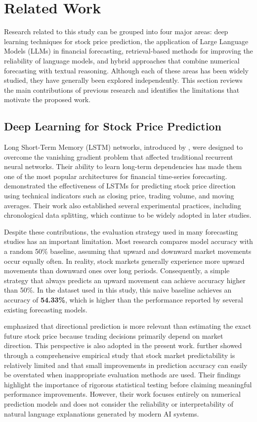 \section{Related Work}\label{sec:related-work}

Research related to this study can be grouped into four major areas:
deep learning techniques for stock price prediction, the application of
Large Language Models (LLMs) in financial forecasting, retrieval-based
methods for improving the reliability of language models, and hybrid
approaches that combine numerical forecasting with textual reasoning.
Although each of these areas has been widely studied, they have
generally been explored independently. This section reviews the main
contributions of previous research and identifies the limitations that
motivate the proposed work.

\subsection{Deep Learning for Stock Price Prediction}\label{sec:deep-learning}

Long Short-Term Memory (LSTM) networks, introduced by \citet{hochreiter1997}, were designed to overcome the vanishing gradient
problem that affected traditional recurrent neural networks. Their
ability to learn long-term dependencies has made them one of the most
popular architectures for financial time-series forecasting. \citet{nelson2017} demonstrated the effectiveness of LSTMs for predicting stock
price direction using technical indicators such as closing price,
trading volume, and moving averages. Their work also established several
experimental practices, including chronological data splitting, which
continue to be widely adopted in later studies.

Despite these contributions, the evaluation strategy used in many
forecasting studies has an important limitation. Most research compares
model accuracy with a random 50\% baseline, assuming that upward and
downward market movements occur equally often. In reality, stock markets
generally experience more upward movements than downward ones over long
periods. Consequently, a simple strategy that always predicts an upward
movement can achieve accuracy higher than 50\%. In the dataset used in
this study, this naive baseline achieves an accuracy of
\textbf{54.33\%}, which is higher than the performance reported by
several existing forecasting models.

\citet{mehtab2020} emphasized that directional prediction is more
relevant than estimating the exact future stock price because trading
decisions primarily depend on market direction. This perspective is also
adopted in the present work. \citet{gu2020} further showed through a
comprehensive empirical study that stock market predictability is
relatively limited and that small improvements in prediction accuracy
can easily be overstated when inappropriate evaluation methods are used.
Their findings highlight the importance of rigorous statistical testing
before claiming meaningful performance improvements. However, their work
focuses entirely on numerical prediction models and does not consider
the reliability or interpretability of natural language explanations
generated by modern AI systems.

